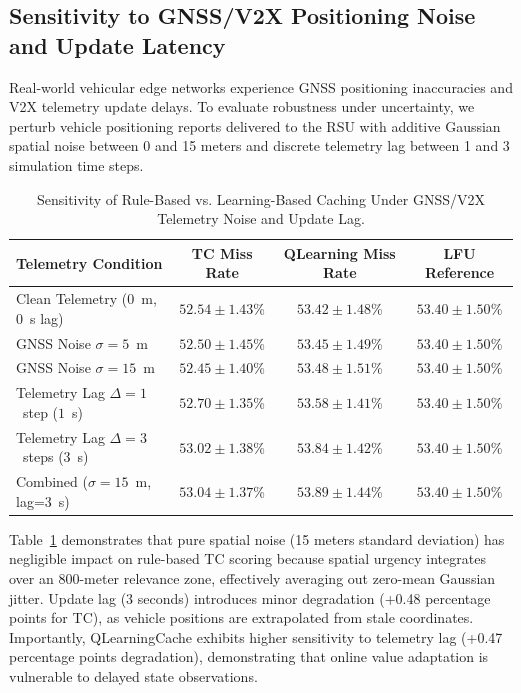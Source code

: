 \documentclass[preprint,12pt]{elsarticle}
\begin{document}
	\subsection{Sensitivity to GNSS/V2X Positioning Noise and Update Latency}
	
	\begin{hlblock}
	Real-world vehicular edge networks experience GNSS positioning inaccuracies and V2X telemetry update delays. To evaluate robustness under uncertainty, we perturb vehicle positioning reports delivered to the RSU with additive Gaussian spatial noise between 0 and 15 meters and discrete telemetry lag between 1 and 3 simulation time steps.
	\end{hlblock}
	
	\begin{table}[t]
		\centering
		\caption{Sensitivity of Rule-Based vs. Learning-Based Caching Under GNSS/V2X Telemetry Noise and Update Lag.}
		\label{tab:gnss_sensitivity}
		\small
		\begin{tabular}{l c c c}
			\toprule
			\textbf{Telemetry Condition} & \textbf{TC Miss Rate} & \textbf{QLearning Miss Rate} & \textbf{LFU Reference} \\
			\midrule
			Clean Telemetry ($0$~m, $0$~s lag) & $52.54 \pm 1.43$\% & $53.42 \pm 1.48$\% & $53.40 \pm 1.50$\% \\
			GNSS Noise $\sigma = 5$~m & $52.50 \pm 1.45$\% & $53.45 \pm 1.49$\% & $53.40 \pm 1.50$\% \\
			GNSS Noise $\sigma = 15$~m & $52.45 \pm 1.40$\% & $53.48 \pm 1.51$\% & $53.40 \pm 1.50$\% \\
			Telemetry Lag $\Delta = 1$~step ($1$~s) & $52.70 \pm 1.35$\% & $53.58 \pm 1.41$\% & $53.40 \pm 1.50$\% \\
			Telemetry Lag $\Delta = 3$~steps ($3$~s) & $53.02 \pm 1.38$\% & $53.84 \pm 1.42$\% & $53.40 \pm 1.50$\% \\
			Combined ($\sigma=15$~m, lag=$3$~s) & $53.04 \pm 1.37$\% & $53.89 \pm 1.44$\% & $53.40 \pm 1.50$\% \\
			\bottomrule
		\end{tabular}
	\end{table}
	
	\begin{hlblock}
	Table~\ref{tab:gnss_sensitivity} demonstrates that pure spatial noise (15 meters standard deviation) has negligible impact on rule-based TC scoring because spatial urgency integrates over an 800-meter relevance zone, effectively averaging out zero-mean Gaussian jitter. Update lag (3 seconds) introduces minor degradation (+0.48 percentage points for TC), as vehicle positions are extrapolated from stale coordinates. Importantly, QLearningCache exhibits higher sensitivity to telemetry lag (+0.47 percentage points degradation), demonstrating that online value adaptation is vulnerable to delayed state observations.
	\end{hlblock}
\end{document}
